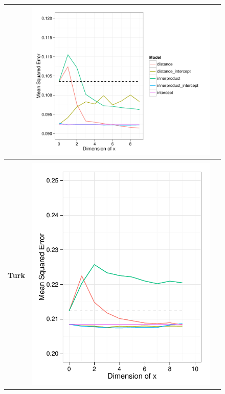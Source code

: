 \begin{figure}
\begin{tabular}{|c|c|c|}
  & \includegraphics[height=0.27\textheight]{chapter_foreign_relations/figures/009_dynamic_model_results.pdf}
  \\
\hline
  \begin{minipage}{2cm} \vspace{-7cm} \textbf{Mechanical} \\
    \textbf{Turk} \end{minipage}
  & \includegraphics[height=0.27\textheight]{chapter_foreign_relations/figures/010_static_model_results.pdf}

\end{tabular}
\end{figure}
